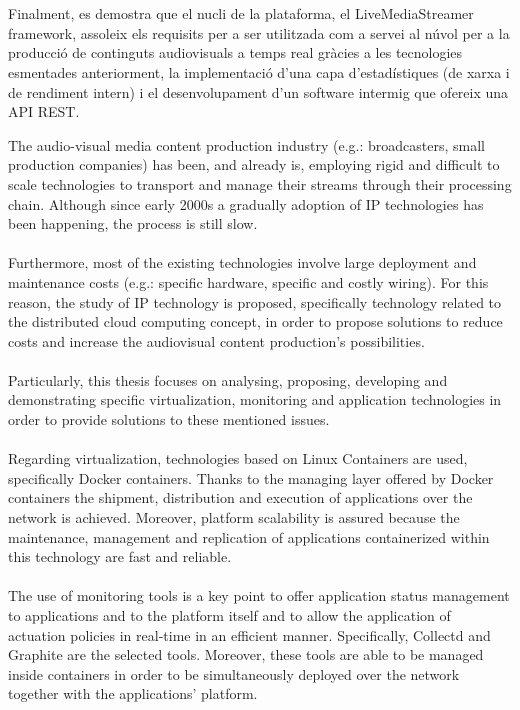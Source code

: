 \documentclass[english,final]{setup/eetac_tfc_pfc}
\begin{document}
\begin{resum}{10cm}
  \\
  \\
  Finalment, es demostra que el nucli de la plataforma, el LiveMediaStreamer framework, assoleix els requisits per a ser utilitzada com a servei al núvol per a la producció de continguts audiovisuals a temps real gràcies a les tecnologies esmentades anteriorment, la implementació d'una capa d'estadístiques (de xarxa i de rendiment intern) i el desenvolupament d'un software intermig que ofereix una API REST.
  
\end{resum}

\begin{overview}{11cm}
  The audio-visual media content production industry (e.g.: broadcasters, small production companies) has been, and already is, employing rigid and difficult to scale technologies to transport and manage their streams through their processing chain. Although since early 2000s a gradually adoption of IP technologies has been happening, the process is still slow.
  \\
  \\
  Furthermore, most of the existing technologies involve large deployment and maintenance costs (e.g.: specific hardware, specific and costly wiring). For this reason, the study of IP technology is proposed, specifically technology related to the distributed cloud computing concept, in order to propose solutions to reduce costs and increase the audiovisual content production's possibilities.
  \\
  \\
  Particularly, this thesis focuses on analysing, proposing, developing and demonstrating specific virtualization, monitoring and application technologies in order to provide solutions to these mentioned issues.   
  \\
  \\
  Regarding virtualization, technologies based on Linux Containers are used, specifically Docker containers. Thanks to the managing layer offered by Docker containers the shipment, distribution and execution of applications over the network is achieved. Moreover, platform scalability is assured because the maintenance, management and replication of applications containerized within this technology are fast and reliable.
  \\
  \\
  The use of monitoring tools is a key point to offer application status management to applications and to the platform itself and to allow the application of actuation policies in real-time in an efficient manner. Specifically, Collectd and Graphite are the selected tools. Moreover, these tools are able to be managed inside containers in order to be simultaneously deployed over the network together with the applications' platform. 

\end{overview}
\end{document}
